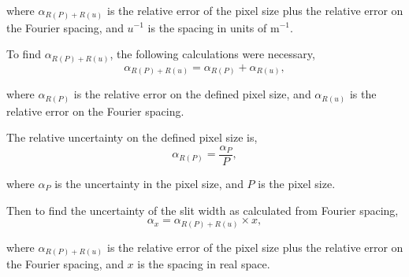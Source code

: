\documentclass[twocolumn]{revtex4}
\begin{document}
where $\alpha_{R(P)+R(u)}$ is the relative error of the pixel size plus the relative error on the Fourier spacing, and $u^{-1}$ is the spacing in units of m$^{-1}$.

To find $\alpha_{R(P)+R(u)}$, the following calculations were necessary,
\begin{equation}
\alpha_{R(P)+R(u)} = \alpha_{R(P)} + \alpha_{R(u)},
\end{equation}

where $\alpha_{R(P)}$ is the relative error on the defined pixel size, and $\alpha_{R(u)}$ is the relative error on the Fourier spacing. 

The relative uncertainty on the defined pixel size is,
\begin{equation}
\alpha_{R(P)} = \frac{\alpha_P}{P},
\end{equation}

where $\alpha_P$ is the uncertainty in the pixel size, and $P$ is the pixel size. 

Then to find the uncertainty of the slit width as calculated from Fourier spacing,
\begin{equation}
\alpha_x = \alpha_{R(P)+R(u)}  \times x,
\end{equation}

where $\alpha_{R(P)+R(u)}$ is the relative error of the pixel size plus the relative error on the Fourier spacing, and $x$ is the spacing in real space.

\clearpage
\end{document}
